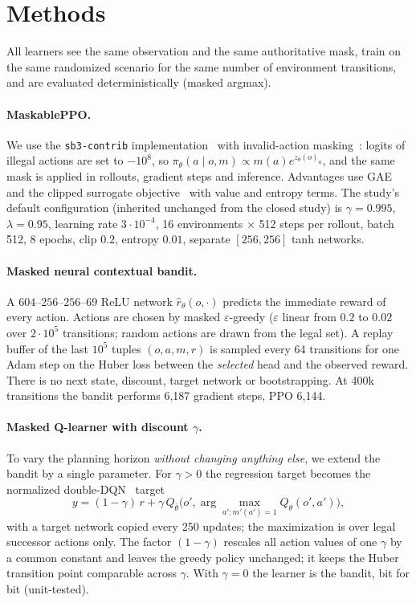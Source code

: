 \section{Methods}
\label{sec:methods}

All learners see the same observation and the same authoritative mask, train
on the same randomized scenario for the same number of environment
transitions, and are evaluated deterministically (masked argmax).

\paragraph{MaskablePPO.}
We use the \texttt{sb3-contrib} implementation~\citep{raffin2021sb3} with
invalid-action masking~\citep{huang2022masking}: logits of illegal actions are
set to $-10^{8}$, so $\pi_\theta(a\mid o,m)\propto m(a)e^{z_\theta(o)_a}$, and the
same mask is applied in rollouts, gradient steps and inference. Advantages use
GAE~\citep{schulman2016gae} and the clipped surrogate
objective~\citep{schulman2017ppo} with value and entropy terms. The study's
default configuration (inherited unchanged from the closed study) is
$\gamma=0.995$, $\lambda=0.95$, learning rate $3\cdot10^{-4}$, 16 environments
$\times$ 512 steps per rollout, batch 512, 8 epochs, clip $0.2$, entropy
$0.01$, separate $[256,256]$ tanh networks.

\paragraph{Masked neural contextual bandit.}
A $604$--$256$--$256$--$69$ ReLU network $\hat r_\theta(o,\cdot)$ predicts the
immediate reward of every action. Actions are chosen by masked
$\varepsilon$-greedy ($\varepsilon$ linear from $0.2$ to $0.02$ over $2\cdot10^5$
transitions; random actions are drawn from the legal set). A replay buffer of
the last $10^5$ tuples $(o,a,m,r)$ is sampled every 64 transitions for one
Adam step on the Huber loss between the \emph{selected} head and the observed
reward. There is no next state, discount, target network or bootstrapping.
At 400k transitions the bandit performs 6{,}187 gradient steps, PPO 6{,}144.

\paragraph{Masked Q-learner with discount $\gamma$.}
To vary the planning horizon \emph{without changing anything else}, we extend
the bandit by a single parameter. For $\gamma>0$ the regression target becomes
the normalized double-DQN~\citep{mnih2015dqn} target
\begin{equation}
y=(1-\gamma)\,r+\gamma\,Q_{\bar\theta}\big(o',\textstyle\arg\max_{a':m'(a')=1}Q_\theta(o',a')\big),
\label{eq:qtarget}
\end{equation}
with a target network copied every 250 updates; the maximization is over legal
successor actions only. The factor $(1-\gamma)$ rescales all action values of
one $\gamma$ by a common constant and leaves the greedy policy unchanged; it
keeps the Huber transition point comparable across $\gamma$. With $\gamma=0$
the learner is the bandit, bit for bit (unit-tested).

